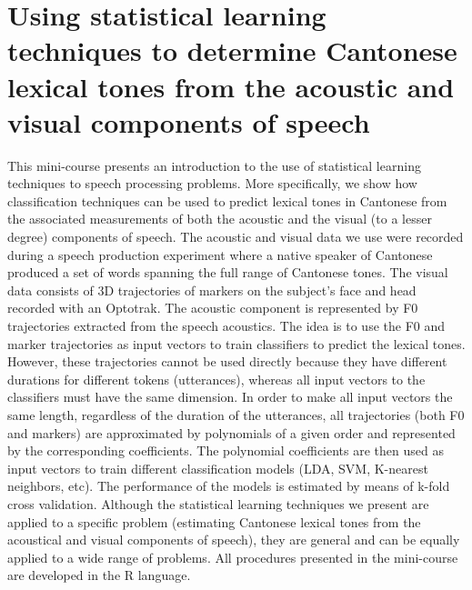 \chapter{Using statistical learning techniques to determine Cantonese lexical tones from the acoustic and visual components of speech}\label{ch:adriano}
\begin{affils}
\end{affils}

\noindent 
This mini-course presents an introduction to the use of statistical learning techniques to speech
processing problems. More specifically, we show how classification techniques can be used to
predict lexical tones in Cantonese from the associated measurements of both the acoustic and the
visual (to a lesser degree) components of speech. The acoustic and visual data we use were recorded
during a speech production experiment where a native speaker of Cantonese produced a set of
words spanning the full range of Cantonese tones. The visual data consists of 3D trajectories of
markers on the subject’s face and head recorded with an Optotrak. The acoustic component is
represented by F0 trajectories extracted from the speech acoustics. The idea is to use the F0 and
marker trajectories as input vectors to train classifiers to predict the lexical tones. However, these
trajectories cannot be used directly because they have different durations for different tokens
(utterances), whereas all input vectors to the classifiers must have the same dimension. In order to
make all input vectors the same length, regardless of the duration of the utterances, all trajectories
(both F0 and markers) are approximated by polynomials of a given order and represented by the
corresponding coefficients. The polynomial coefficients are then used as input vectors to train
different classification models (LDA, SVM, K-nearest neighbors, etc). The performance of the
models is estimated by means of k-fold cross validation. Although the statistical learning techniques
we present are applied to a specific problem (estimating Cantonese lexical tones from the acoustical
and visual components of speech), they are general and can be equally applied to a wide range of
problems. All procedures presented in the mini-course are developed in the R language.
